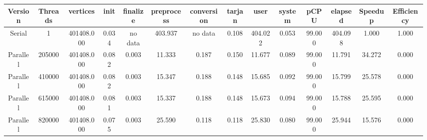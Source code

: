 \begin{tabular}{|c|c|c|c|c|c|c|c|c|c|c|c|c|c|}
\toprule
 Version &  Threads &   vertices &  init & finalize &  preprocess & conversion &  tarjan &    user &  system &   pCPU &  elapsed &  Speedup &  Efficiency \\
\midrule
  Serial &        1 & 401408.000 & 0.034 &  no data &     403.937 &    no data &   0.108 & 404.022 &   0.053 & 99.000 &  404.098 &    1.000 &       1.000 \\
Parallel &   205000 & 401408.000 & 0.082 &    0.003 &      11.333 &      0.187 &   0.150 &  11.677 &   0.089 & 99.000 &   11.791 &   34.272 &       0.000 \\
Parallel &   410000 & 401408.000 & 0.082 &    0.003 &      15.347 &      0.188 &   0.148 &  15.685 &   0.092 & 99.000 &   15.799 &   25.578 &       0.000 \\
Parallel &   615000 & 401408.000 & 0.081 &    0.003 &      15.337 &      0.188 &   0.148 &  15.673 &   0.094 & 99.000 &   15.788 &   25.595 &       0.000 \\
Parallel &   820000 & 401408.000 & 0.075 &    0.003 &      25.590 &      0.118 &   0.118 &  25.830 &   0.080 & 99.000 &   25.944 &   15.576 &       0.000 \\
\bottomrule
\end{tabular}
